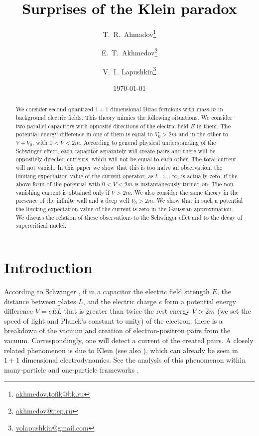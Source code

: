 \documentclass[12pt]{article}
\title{\textcolor{black}{Surprises of the Klein paradox}}
\author[1]{T.~R.~Ahmadov\thanks{\href{mailto:akhmedov.tofik@bk.ru}{akhmedov.tofik@bk.ru}}}
\author[2,3]{E.~T.~Akhmedov\thanks{\href{mailto:akhmedov@itep.ru}{akhmedov@itep.ru}}}
\author[2]{V.~I.~Lapushkin\thanks{\href{mailto:volapushkin@gmail.com}{volapushkin@gmail.com}}}
\affil[1]{\itshape Azerbaijan State Oil and Industry University, Baku, Azerbaijan}
\affil[2]{\itshape Institutskii per, 9, Moscow Institute of Physics and Technology, 141700, Dolgoprudny, Russia}
\affil[3]{\itshape Academician Kurchatov Square, 1, NRC ''Kurchatov Institute'', 123182, Moscow, Russia}
\date{\today}
\begin{document}
\maketitle

\begin{abstract}
We consider second quantized $1+1$ dimensional Dirac fermions with mass $m$ in background electric fields. This theory mimics the following situations. We consider two parallel capacitors with opposite directions of the electric field $E$ in them. The potential energy difference in one of them is equal to $V_0 > 2m$ and in the other to $V+V_0$, with $0<V<2m$. According to general physical understanding of the Schwinger effect, each capacitor separately will create pairs and there will be oppositely directed currents, which will not be equal to each other. The total current will not vanish. In this paper we show that this is too naive an observation: the limiting expectation value of the current operator, as $t\to +\infty$, is actually zero, if the above form of the potential with $0<V<2m$ is instantaneously turned on. The non-vanishing current is obtained only if $V>2m$. We also consider the same theory in the presence of the infinite wall and a deep well $V_0>2m$. We show that in such a potential the limiting expectation value of the current is zero in the Gaussian approximation. We discuss the relation of these observations to the Schwinger effet and to the decay of supercritical nuclei.  
\end{abstract}


\newpage

\tableofcontents

\newpage
    
\section{Introduction}

According to Schwinger \cite{Schwinger:1951nm}, if in a capacitor the electric field strength $E$, the distance between plates $L$, and the electric charge $e$ form a potential energy difference $V=eEL$ that is greater than twice the rest energy $V>2m$ (we set the speed of light and Planck's constant to unity) of the electron, there is a breakdown of the vacuum and creation of electron-positron pairs from the vacuum. Correspondingly, one will detect a current of the created pairs. A closely related phenomenon is due to Klein \cite{Klein} (see also \cite{Calogeracos:1999yp}), which can already be seen in $1+1$ dimensional electrodynamics. See the analysis of this phenomenon within many-particle \cite{Calogeracos:1998rf, Gavrilov:2015yha, Nikishov:1970br, Nikishov1985} and one-particle frameworks \cite{Nikishov:1970br, ternov2024paradoks15483}.
\end{document}
